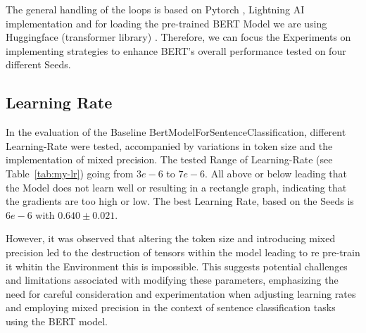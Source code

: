 \vspace{0.3cm}

The general handling of the loops is based on Pytorch \cite{noauthor_pytorch_nodate}, Lightning AI \cite{noauthor_lightning_nodate}
implementation and for loading the pre-trained BERT Model we are using Huggingface (transformer library) \cite{noauthor_hugging_2023}.
Therefore, we can focus the Experiments on implementing strategies to enhance BERT's overall performance tested on four different Seeds.











\newpage
\subsection{Learning Rate}

In the evaluation of the Baseline BertModelForSentenceClassification, different Learning-Rate 
were tested, accompanied by variations in token size and the implementation of mixed precision.
The tested Range of Learning-Rate (see Table~\ref{tab:my-lr}) going from $3e-6$ to $7e-6$. All above or
below leading that the Model does not learn well or resulting in a rectangle graph, indicating
that the gradients are too high or low. The best Learning Rate, based on the Seeds is $6e-6$ with
$0.640 \pm 0.021$.

However, it was observed that altering the token size and introducing mixed precision led to 
the destruction of tensors within the model leading to re pre-train it whitin the Environment
this is impossible. 
This suggests potential challenges and limitations associated with modifying these parameters, 
emphasizing the need for careful consideration and experimentation when adjusting 
learning rates and employing mixed precision in the context of sentence classification 
tasks using the BERT model.

